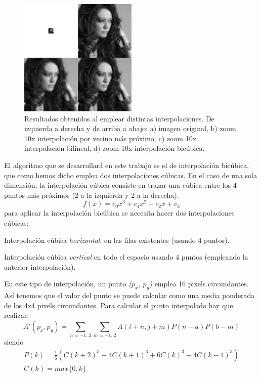 \documentclass{article}
\begin{document}
\begin{figure}[h]
  \centering
    \includegraphics[width=0.5\textwidth]{img/example.png}
  \caption{Resultados obtenidos al emplear distintas interpolaciones. De izquierda a derecha y de arriba a abajo:
  a) imagen original, b) zoom 10x interpolación por vecino más próximo, c) zoom 10x interpolación bilineal, d) zoom 10x interpolación bicúbica.}
  \label{fig:interpolationExample}
\end{figure}

{\setlength{\parskip}{0mm}
El algoritmo que se desarrollará en este trabajo es el de interpolación bicúbica, que como hemos dicho emplea dos interpolaciones cúbicas. En el caso de una sola dimensión, la interpolación cúbica consiste en trazar una cúbica entre los 4 puntos más próximos (2 a la izquierda y 2 a la derecha).
\begin{equation}
\label{eq:interpolacionCubica}
f(x) = c_0 x^3 + c_1 x^2 + c_2 x + c_3
\end{equation}
para aplicar la interpolación bicúbica se necesita hacer dos interpolaciones cúbicas:
\begin{enumerate}{\setlength{\parskip}{0mm}
	\item Interpolación cúbica \emph{horizontal}, en las filas existentes (usando 4 puntos).
	\item Interpolación cúbica \emph{vertical} en todo el espacio usando 4 puntos (empleando la anterior interpolación).
}\end{enumerate}
}

En este tipo de interpolación, un punto \emph{($p_x$, $p_y$)} emplea 16 pixels circundantes. Así tenemos que el valor del punto se puede calcular como una media ponderada de los 4x4 pixels circundantes. Para calcular el punto interpolado hay que realizar:
\begin{equation}
	A'(p_x ,p_y ) = \sum_{n = -1..2} \sum_{m=-1..2} A(i+n, j+m)P(n-a)P(b-m)
\end{equation}
siendo
\begin{displaymath}
	\begin{matrix}	
		P(k) = \frac{1}{6}(C(k+2)^3 - 4C(k+1)^3 + 6C(k)^3 -4C(k-1)^3) \\
		C(k) = max\lbrace 0, k \rbrace
	\end{matrix}
\end{displaymath}
\end{document}

